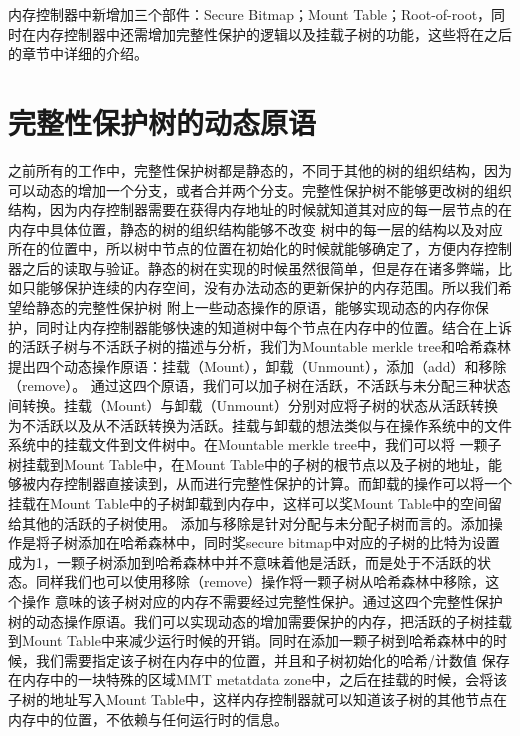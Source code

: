 内存控制器中新增加三个部件：Secure Bitmap；Mount Table；Root-of-root，同时在内存控制器中还需增加完整性保护的逻辑以及挂载子树的功能，这些将在之后的章节中详细的介绍。

\section{完整性保护树的动态原语}
之前所有的工作中，完整性保护树都是静态的，不同于其他的树的组织结构，因为可以动态的增加一个分支，或者合并两个分支。完整性保护树不能够更改树的组织结构，因为内存控制器需要在获得内存地址的时候就知道其对应的每一层节点的在内存中具体位置，静态的树的组织结构能够不改变
树中的每一层的结构以及对应所在的位置中，所以树中节点的位置在初始化的时候就能够确定了，方便内存控制器之后的读取与验证。静态的树在实现的时候虽然很简单，但是存在诸多弊端，比如只能够保护连续的内存空间，没有办法动态的更新保护的内存范围。所以我们希望给静态的完整性保护树
附上一些动态操作的原语，能够实现动态的内存你保护，同时让内存控制器能够快速的知道树中每个节点在内存中的位置。结合在上诉的活跃子树与不活跃子树的描述与分析，我们为Mountable merkle tree和哈希森林提出四个动态操作原语：挂载（Mount），卸载（Unmount），添加（add）和移除（remove）。
通过这四个原语，我们可以加子树在活跃，不活跃与未分配三种状态间转换。挂载（Mount）与卸载（Unmount）分别对应将子树的状态从活跃转换为不活跃以及从不活跃转换为活跃。挂载与卸载的想法类似与在操作系统中的文件系统中的挂载文件到文件树中。在Mountable merkle tree中，我们可以将
一颗子树挂载到Mount Table中，在Mount Table中的子树的根节点以及子树的地址，能够被内存控制器直接读到，从而进行完整性保护的计算。而卸载的操作可以将一个挂载在Mount Table中的子树卸载到内存中，这样可以奖Mount Table中的空间留给其他的活跃的子树使用。
添加与移除是针对分配与未分配子树而言的。添加操作是将子树添加在哈希森林中，同时奖secure bitmap中对应的子树的比特为设置成为1，一颗子树添加到哈希森林中并不意味着他是活跃，而是处于不活跃的状态。同样我们也可以使用移除（remove）操作将一颗子树从哈希森林中移除，这个操作
意味的该子树对应的内存不需要经过完整性保护。通过这四个完整性保护树的动态操作原语。我们可以实现动态的增加需要保护的内存，把活跃的子树挂载到Mount  Table中来减少运行时候的开销。同时在添加一颗子树到哈希森林中的时候，我们需要指定该子树在内存中的位置，并且和子树初始化的哈希/计数值
保存在内存中的一块特殊的区域MMT metatdata zone中，之后在挂载的时候，会将该子树的地址写入Mount Table中，这样内存控制器就可以知道该子树的其他节点在内存中的位置，不依赖与任何运行时的信息。

